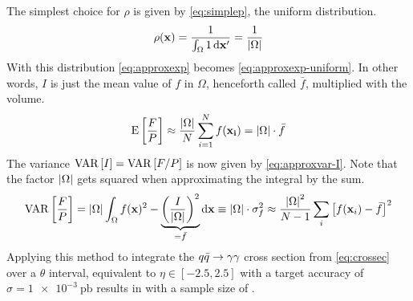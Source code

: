 The simplest choice for \(\rho\) is given
by \cref{eq:simplep}, the uniform distribution.
%
\begin{equation}
  \label{eq:simplep}
  \rho(\vb{x}) = \frac{1}{\int_{\Omega}1\dd{\vb{x'}}} =
  \frac{1}{\abs{\Omega}}
\end{equation}
%
With this distribution \cref{eq:approxexp} becomes
\cref{eq:approxexp-uniform}. In other words, \(I\) is just the mean
value of \(f\) in \(\Omega\), henceforth called \(\bar{f}\),
multiplied with the volume.
%
\begin{equation}
  \label{eq:approxexp-uniform}
  \operatorname{E}\qty[\frac{F}{P}] \approx
  \frac{\abs{\Omega}}{N}\sum_{i=1}^N f(\vb{x_i}) = \abs{\Omega}\cdot\bar{f}
\end{equation}
%
The variance \(\operatorname{VAR}\qty[I]=\operatorname{VAR}\qty[F/P]\) is now given
by \cref{eq:approxvar-I}. Note that the factor \(\abs{\Omega}\) gets
squared when approximating the integral by the sum.
%
\begin{equation}
  \label{eq:approxvar-I}
  \operatorname{VAR}\qty[\frac{F}{P}] = \abs{\Omega}\int_\Omega f(\vb{x})^2 -
  \underbrace{\qty(\frac{I}{\abs{\Omega}})^2}_{=\bar{f}} \dd{\vb{x}} \equiv \abs{\Omega}\cdot\sigma_f^2 \approx
  \frac{\abs{\Omega}^2}{N-1}\sum_{i}\qty[f(\vb{x}_i) - \bar{f}]^2
\end{equation}
%
Applying this method to integrate the \(q\bar{q}\rightarrow\gamma\gamma\) cross section from
\cref{eq:crossec} over a \(\theta\) interval, equivalent to
\(\eta\in [-2.5, 2.5]\) with a target accuracy of
\(\sigma=\SI{1e-3}{\pico\barn}\) results in
 with a sample size of
.

